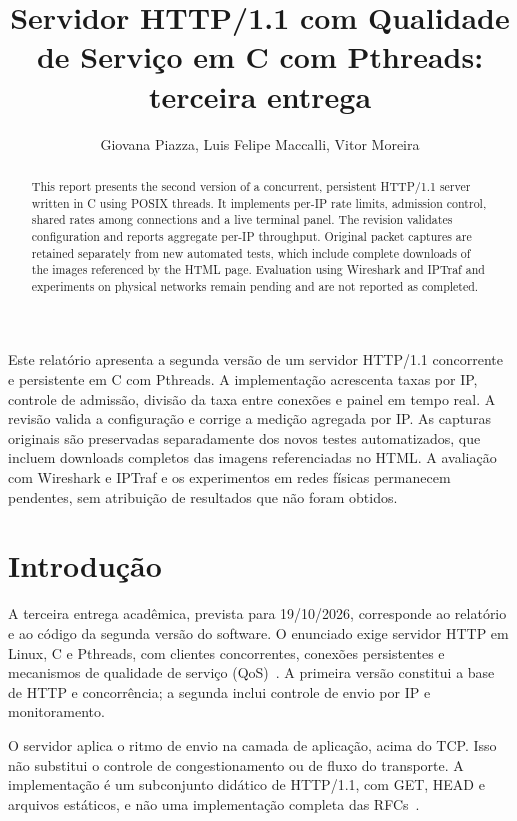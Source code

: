 \documentclass[12pt]{article}
\title{Servidor HTTP/1.1 com Qualidade de Serviço em C com Pthreads: terceira entrega}
\author{Giovana Piazza\inst{1}, Luis Felipe Maccalli\inst{1}, Vitor Moreira\inst{1}}
\begin{document}
\renewcommand{\refname}{Referências}
\maketitle
\begin{abstract}
This report presents the second version of a concurrent, persistent HTTP/1.1
server written in C using POSIX threads. It implements per-IP rate limits,
admission control, shared rates among connections and a live terminal panel.
The revision validates configuration and reports aggregate per-IP throughput.
Original packet captures are retained separately from new automated tests,
which include complete downloads of the images referenced by the HTML page.
Evaluation using Wireshark and IPTraf and experiments on physical networks
remain pending and are not reported as completed.
\end{abstract}
\begin{resumo}
Este relatório apresenta a segunda versão de um servidor HTTP/1.1 concorrente
e persistente em C com Pthreads. A implementação acrescenta taxas por IP,
controle de admissão, divisão da taxa entre conexões e painel em tempo real.
A revisão valida a configuração e corrige a medição agregada por IP. As
capturas originais são preservadas separadamente dos novos testes automatizados,
que incluem downloads completos das imagens referenciadas no HTML. A avaliação
com Wireshark e IPTraf e os experimentos em redes físicas permanecem pendentes,
sem atribuição de resultados que não foram obtidos.
\end{resumo}

\section{Introdução}
A terceira entrega acadêmica, prevista para 19/10/2026, corresponde ao relatório
e ao código da segunda versão do software. O enunciado exige servidor HTTP em
Linux, C e Pthreads, com clientes concorrentes, conexões persistentes e mecanismos
de qualidade de serviço (QoS)~\cite{spec}. A primeira versão constitui a base de
HTTP e concorrência; a segunda inclui controle de envio por IP e monitoramento.

O servidor aplica o ritmo de envio na camada de aplicação, acima do TCP. Isso
não substitui o controle de congestionamento ou de fluxo do transporte. A
implementação é um subconjunto didático de HTTP/1.1, com GET, HEAD e arquivos
estáticos, e não uma implementação completa das RFCs~\cite{http,sem}.
\end{document}
